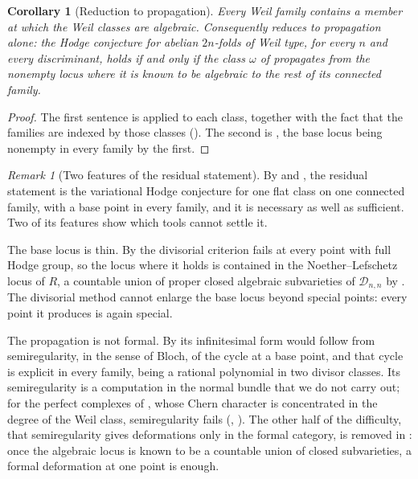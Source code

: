 \documentclass[11pt,reqno]{amsart}
\theoremstyle{plain}
\newtheorem{corollary}[theorem]{Corollary}
\theoremstyle{definition}
\theoremstyle{remark}
\newtheorem{remark}[theorem]{Remark}
\newcommand{\cD}{\mathcal{D}}
\begin{document}
\begin{corollary}[Reduction to propagation]\label{cor:R2}
Every Weil family contains a member at which the Weil classes are algebraic.
Consequently  reduces to propagation alone: the Hodge
conjecture for abelian $2n$-folds of Weil type, for every $n$ and every
discriminant, holds if and only if the class $\omega$ of
 propagates from the nonempty locus where it is known to be
algebraic to the rest of its connected family.
\end{corollary}

\begin{proof}
The first sentence is  applied to each class, together
with the fact that the families are indexed by those classes
(). The second is , the base locus being
nonempty in every family by the first.
\end{proof}

\begin{remark}[Two features of the residual statement]\label{rem:whatsleftnow}
By  and , the residual statement is the
variational Hodge conjecture for one flat class on one connected family, with
a base point in every family, and it is necessary as well as sufficient. Two
of its features show which tools cannot settle it.

The base locus is thin. By  the divisorial criterion fails
at every point with full Hodge group, so the locus where it holds is contained
in the Noether--Lefschetz locus of $R$, a countable union of proper closed
algebraic subvarieties of $\cD_{n,n}$ by . The divisorial
method cannot enlarge the base locus beyond special points: every point it
produces is again special.

The propagation is not formal. By  its infinitesimal
form would follow from semiregularity, in the sense of Bloch, of the cycle at
a base point, and that cycle is explicit in every family, being a rational
polynomial in two divisor classes. Its semiregularity is a computation in the
normal bundle that we do not carry out; for the perfect complexes of
\cite[Proposition~2.1]{paperII}, whose Chern character is concentrated in the degree of
the Weil class, semiregularity fails (,
\cite[Theorem~3.5]{paperII}). The other half of the difficulty, that semiregularity
gives deformations only in the formal category, is removed in
: once the algebraic locus is known to be a countable
union of closed subvarieties, a formal deformation at one point is enough.
\end{remark}
\end{document}
